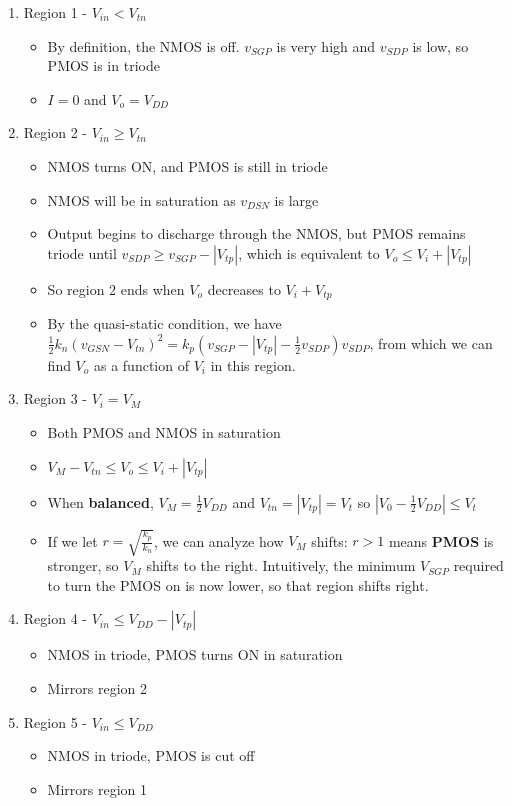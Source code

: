 \documentclass[11pt]{report}
\begin{document}
\begin{enumerate}
	\item Region 1 - $V_{in} < V_{tn}$
	\begin{itemize}
		\item By definition, the NMOS is off. $v_{SGP}$ is very high and $v_{SDP}$ is low, so PMOS is in triode
		\item $I=0$ and $V_o=V_{DD}$
	\end{itemize}
	\item Region 2 - $V_{in} \ge V_{tn}$
	\begin{itemize}
		\item NMOS turns ON, and PMOS is still in triode
		\item NMOS will be in saturation as $v_{DSN}$ is large
		\item Output begins to discharge through the NMOS, but PMOS remains triode until $v_{SDP} \ge v_{SGP} - |V_{tp}|$, which is equivalent to $V_o \le V_i + |V_{tp}|$
		\item So region 2 ends when $V_o$ decreases to $V_i + V_{tp}$
		\item By the quasi-static condition, we have $\frac{1}{2}k_n(v_{GSN} - V_{tn})^2 = k_p(v_{SGP} - |V_{tp}| - \frac{1}{2}v_{SDP})v_{SDP}$, from which we can find $V_o$ as a function of $V_i$ in this region.
	\end{itemize}
	\item Region 3 - $V_i = V_M$
	\begin{itemize}
		\item Both PMOS and NMOS in saturation
		\item $V_M - V_{tn} \le V_o \le V_i + |V_{tp}|$
		\item When \textbf{balanced}, $V_M = \frac{1}{2}V_{DD}$ and $V_{tn}=|V_{tp}|=V_t$ so $|V_0 - \frac{1}{2}V_{DD}| \le V_t$
		\item If we let $r = \sqrt{\frac{k_p}{k_n}}$, we can analyze how $V_M$ shifts: $r > 1$ means \textbf{PMOS} is stronger, so $V_M$ shifts to the right. Intuitively, the minimum $V_{SGP}$ required to turn the PMOS on is now lower, so that region shifts right.
	\end{itemize}
	\item Region 4 - $V_{in} \le V_{DD} - |V_{tp}|$
	\begin{itemize}
		\item NMOS in triode, PMOS turns ON in saturation
		\item Mirrors region 2
	\end{itemize}
	\item Region 5 - $V_{in} \le V_{DD}$
	\begin{itemize}
		\item NMOS in triode, PMOS is cut off
		\item Mirrors region 1
	\end{itemize}
\end{enumerate}
\end{document}
